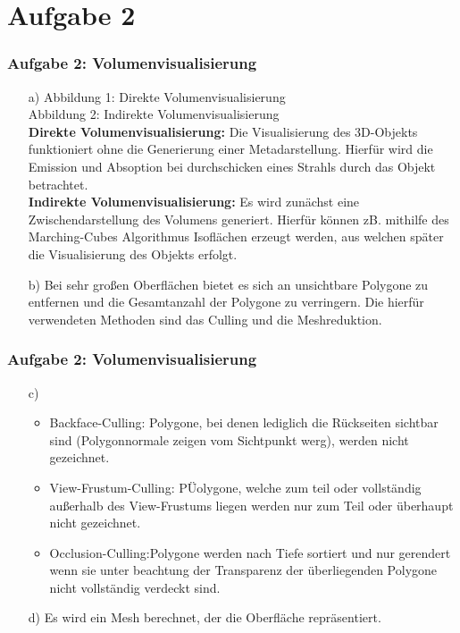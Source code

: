 \documentclass[accentcolor=tud9c,colorbacktitle,inverttitle,landscape,german,presentation,t]{tudbeamer}
\begin{document}
\section{Aufgabe 2}
\begin{frame}
	\frametitle{Aufgabe 2: Volumenvisualisierung}
			\begin{itemize}
			\item[a)]
			Abbildung 1: Direkte Volumenvisualisierung \\
			Abbildung 2: Indirekte Volumenvisualisierung \\
			\textbf{Direkte Volumenvisualisierung:} Die Visualisierung des 3D-Objekts funktioniert ohne die Generierung einer Metadarstellung. Hierfür wird die Emission und Absoption bei durchschicken eines Strahls durch das Objekt betrachtet. \\
			\textbf{Indirekte Volumenvisualisierung:} Es wird zunächst eine Zwischendarstellung des Volumens generiert. Hierfür können zB. mithilfe des Marching-Cubes Algorithmus Isoflächen erzeugt werden, aus welchen später die Visualisierung des Objekts erfolgt.
			\item[b)]
			Bei sehr großen Oberflächen bietet es sich an unsichtbare Polygone zu entfernen und die Gesamtanzahl der Polygone zu verringern. Die hierfür verwendeten Methoden sind das Culling und die Meshreduktion.
	\end{itemize}
\end{frame}
\begin{frame}
	\frametitle{Aufgabe 2: Volumenvisualisierung}
	\begin{itemize}
		\item[c)]
			\begin{itemize}
			\item Backface-Culling: Polygone, bei denen lediglich die Rückseiten sichtbar sind (Polygonnormale zeigen vom Sichtpunkt werg), werden nicht gezeichnet. \\
			\item View-Frustum-Culling: PÜolygone, welche zum teil oder vollständig außerhalb des View-Frustums liegen werden nur zum Teil oder überhaupt nicht gezeichnet.\\
			\item Occlusion-Culling:Polygone werden nach Tiefe sortiert und nur gerendert wenn sie unter beachtung der Transparenz der überliegenden Polygone nicht vollständig verdeckt sind.\\
			\end{itemize}
		
		\item[d)] Es wird ein Mesh berechnet, der die Oberfläche repräsentiert.
	\end{itemize}
\end{frame}
\end{document}
